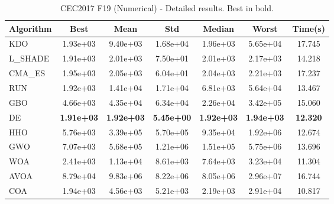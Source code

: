 \begin{table}[H]
\centering\small
\caption{CEC2017 F19 (Numerical) - Detailed results. Best in bold.}
\label{tab:cec2017_F19}
\begin{tabular}{lcccccc}
\toprule
\textbf{Algorithm} & \textbf{Best} & \textbf{Mean} & \textbf{Std} & \textbf{Median} & \textbf{Worst} & \textbf{Time(s)} \\
\midrule
KDO & 1.93e+03 & 9.40e+03 & 1.68e+04 & 1.96e+03 & 5.65e+04 & 17.745 \\
L_SHADE & 1.91e+03 & 2.01e+03 & 7.50e+01 & 2.01e+03 & 2.17e+03 & 14.218 \\
CMA_ES & 1.95e+03 & 2.05e+03 & 6.04e+01 & 2.04e+03 & 2.21e+03 & 17.237 \\
RUN & 1.92e+03 & 1.41e+04 & 1.71e+04 & 6.81e+03 & 5.64e+04 & 13.467 \\
GBO & 4.66e+03 & 4.35e+04 & 6.34e+04 & 2.26e+04 & 3.42e+05 & 15.060 \\
DE & \textbf{1.91e+03} & \textbf{1.92e+03} & \textbf{5.45e+00} & \textbf{1.92e+03} & \textbf{1.94e+03} & \textbf{12.320} \\
HHO & 5.76e+03 & 3.39e+05 & 5.70e+05 & 9.35e+04 & 1.92e+06 & 12.674 \\
GWO & 7.07e+03 & 5.68e+05 & 1.21e+06 & 1.51e+05 & 5.75e+06 & 13.696 \\
WOA & 2.41e+03 & 1.13e+04 & 8.61e+03 & 7.64e+03 & 3.23e+04 & 11.304 \\
AVOA & 8.79e+04 & 9.83e+06 & 8.22e+06 & 8.05e+06 & 2.96e+07 & 16.744 \\
COA & 1.94e+03 & 4.56e+03 & 5.21e+03 & 2.19e+03 & 2.91e+04 & 10.817 \\
\bottomrule
\end{tabular}
\end{table}
